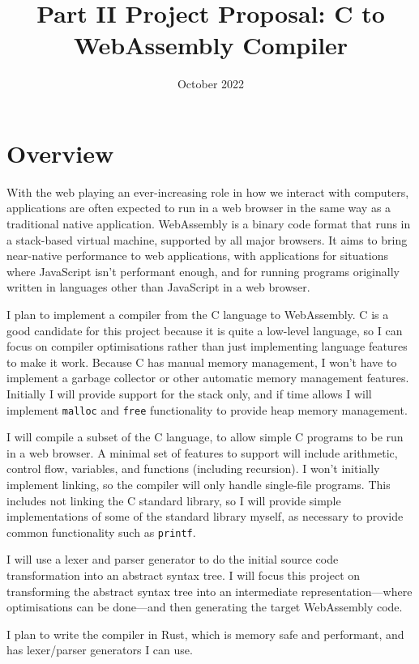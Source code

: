 \documentclass[12pt,a4paper]{article}
\title{Part II Project Proposal: C to WebAssembly Compiler}
\author{}
\date{October 2022}
\begin{document}
\maketitle
\thispagestyle{firstpage}

\section*{Overview}

With the web playing an ever-increasing role in how we interact with computers, applications are often expected to run in a web browser in the same way as a traditional native application. Web\-Assembly is a binary code format that runs in a stack-based virtual machine, supported by all major browsers. It aims to bring near-native performance to web applications, with applications for situations where JavaScript isn't performant enough, and for running programs originally written in languages other than JavaScript in a web browser.

I plan to implement a compiler from the C language to WebAssembly.
C is a good candidate for this project because it is quite a low-level language, so I can focus on compiler optimisations rather than just implementing language features to make it work. Because C has manual memory management, I won't have to implement a garbage collector or other automatic memory management features.
Initially I will provide support for the stack only, and if time allows I will implement \texttt{malloc} and \texttt{free} functionality to provide heap memory management.

I will compile a subset of the C language, to allow simple C programs to be run in a web browser. A minimal set of features to support will include arithmetic, control flow, variables, and functions (including recursion).
I won't initially implement linking, so the compiler will only handle single-file programs. This includes not linking the C standard library, so I will provide simple implementations of some of the standard library myself, as necessary to provide common functionality such as \texttt{printf}.

I will use a lexer and parser generator to do the initial source code transformation into an abstract syntax tree.
I will focus this project on transforming the abstract syntax tree into an intermediate representation---where optimisations can be done---and then generating the target WebAssembly code.

I plan to write the compiler in Rust, which is memory safe and performant, and has lexer/parser generators I can use.
\end{document}
